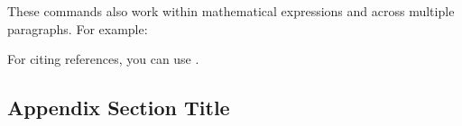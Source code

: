 \documentclass[usletter,12pt]{article}
\begin{document}
These commands also work within mathematical expressions and across multiple paragraphs. For example:



For citing references, you can use \citep{Cyrus2018RobustAcceleratedOptimization}.

\newpage



\newpage
\begin{appendices}
\section{Appendix Section Title}
\end{appendices}
\end{document}
